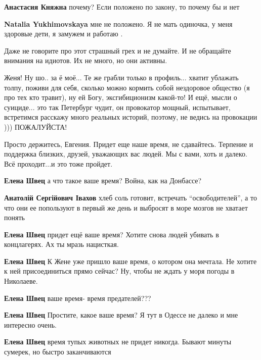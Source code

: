 \begin{itemize}
\begin{itemize}
\textbf{Анастасия Княжна} почему? Если положено по закону, то почему бы и нет

\textbf{Natalia Yukhimovskaya} мне не положено. Я не мать одиночка, у меня здоровые дети, я замужем и работаю .
\end{itemize} %

Даже не говорите про этот страшный грех и не думайте.
И не обращайте внимания на идиотов. Их не много, но они активны.


Женя! Ну шо.. за ё моё... Те же грабли только в профиль... хватит ублажать толпу,
поживи для себя, сколько можно кормить собой нездоровое общество (я про тех кто
травит), ну ей Богу, эксгибиционизм какой-то! И ещё, мысли о суициде... это так
Петербург чудит, он провокатор мощный, испытывает, встретимся расскажу много
реальных историй, поэтому, не ведись на провокации ))) ПОЖАЛУЙСТА!



Просто держитесь, Евгения. Придет еще наше время, не сдавайтесь. Терпение и
поддержка близких, друзей, уважающих вас людей. Мы с вами, хоть и далеко. Всё
проходит...и это тоже пройдет.

\begin{itemize} %
\textbf{Елена Швец} а что такое ваше время? Война, как на Донбассе?

\textbf{Анатолій Сергійович Івахов} хлеб соль готовит, встречать \enquote{освободителей}, а то что они ее попользуют в первый же день и выбросят в море мозгов не хватает понять

\textbf{Елена Швец} придет ещё ваше время? Хотите снова людей убивать в концлагерях. Ах ты мразь нацисткая.

\textbf{Елена Швец} К Жене уже пришло ваше время, о котором она мечтала. Не хотите к ней присоединиться прямо сейчас? Ну, чтобы не ждать у моря погоды в Николаеве.

\textbf{Елена Швец} ваше время- время предателей???

\textbf{Елена Швец} Простите, какое ваше время? Я тут в Одессе не далеко и мне интересно очень.

\textbf{Елена Швец} время тупых животных не придет никогда. Бывают минуты сумерек, но быстро заканчиваются


\end{itemize}
\end{itemize}
